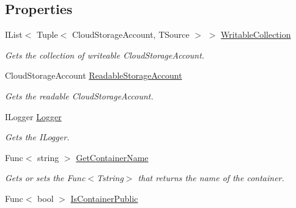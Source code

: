 \subsection*{Properties}
\begin{DoxyCompactItemize}
\item 
I\+List$<$ Tuple$<$ Cloud\+Storage\+Account, T\+Source $>$ $>$ \hyperlink{classCqrs_1_1Azure_1_1BlobStorage_1_1StorageStore_aece11e874587ca60913d275079dfc13c_aece11e874587ca60913d275079dfc13c}{Writable\+Collection}
\begin{DoxyCompactList}\small\item\em Gets the collection of writeable Cloud\+Storage\+Account. \end{DoxyCompactList}\item 
Cloud\+Storage\+Account \hyperlink{classCqrs_1_1Azure_1_1BlobStorage_1_1StorageStore_af0e0bcba6758fda015f51b07eb464b14_af0e0bcba6758fda015f51b07eb464b14}{Readable\+Storage\+Account}
\begin{DoxyCompactList}\small\item\em Gets the readable Cloud\+Storage\+Account. \end{DoxyCompactList}\item 
I\+Logger \hyperlink{classCqrs_1_1Azure_1_1BlobStorage_1_1StorageStore_acb1c7917bb897f51685d367b035ee119_acb1c7917bb897f51685d367b035ee119}{Logger}
\begin{DoxyCompactList}\small\item\em Gets the I\+Logger. \end{DoxyCompactList}\item 
Func$<$ string $>$ \hyperlink{classCqrs_1_1Azure_1_1BlobStorage_1_1StorageStore_acc1c1e865c9a59772a29cfe44d39e48a_acc1c1e865c9a59772a29cfe44d39e48a}{Get\+Container\+Name}
\begin{DoxyCompactList}\small\item\em Gets or sets the Func$<$\+Tstring$>$ that returns the name of the container. \end{DoxyCompactList}\item 
Func$<$ bool $>$ \hyperlink{classCqrs_1_1Azure_1_1BlobStorage_1_1StorageStore_a80dc0d2697bbd1e652d5194df8744ae8_a80dc0d2697bbd1e652d5194df8744ae8}{Is\+Container\+Public}

\end{DoxyCompactItemize}
